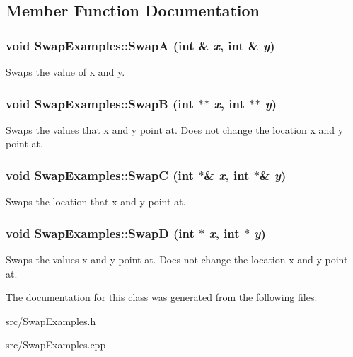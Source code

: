 \subsection{Member Function Documentation}
\hypertarget{classSwapExamples_a5f1db10656b5afe7efffa4e7df9ad36f}{
\subsubsection[{SwapA}]{\setlength{\rightskip}{0pt plus 5cm}void SwapExamples::SwapA (int \& {\em x}, \/  int \& {\em y})}}
\label{classSwapExamples_a5f1db10656b5afe7efffa4e7df9ad36f}
Swaps the value of x and y. \hypertarget{classSwapExamples_aa8f171680c769038e041cdd95e34115a}{
\subsubsection[{SwapB}]{\setlength{\rightskip}{0pt plus 5cm}void SwapExamples::SwapB (int $\ast$$\ast$ {\em x}, \/  int $\ast$$\ast$ {\em y})}}
\label{classSwapExamples_aa8f171680c769038e041cdd95e34115a}
Swaps the values that x and y point at. Does not change the location x and y point at. \hypertarget{classSwapExamples_a44e958009befa1f49bf80968ca401f45}{
\subsubsection[{SwapC}]{\setlength{\rightskip}{0pt plus 5cm}void SwapExamples::SwapC (int $\ast$\& {\em x}, \/  int $\ast$\& {\em y})}}
\label{classSwapExamples_a44e958009befa1f49bf80968ca401f45}
Swaps the location that x and y point at. \hypertarget{classSwapExamples_a50e369332f53d06620e82f195baa1f5a}{
\subsubsection[{SwapD}]{\setlength{\rightskip}{0pt plus 5cm}void SwapExamples::SwapD (int $\ast$ {\em x}, \/  int $\ast$ {\em y})}}
\label{classSwapExamples_a50e369332f53d06620e82f195baa1f5a}
Swaps the values x and y point at. Does not change the location x and y point at. 

The documentation for this class was generated from the following files:\begin{DoxyCompactItemize}
\item 
src/SwapExamples.h\item 
src/SwapExamples.cpp\end{DoxyCompactItemize}
